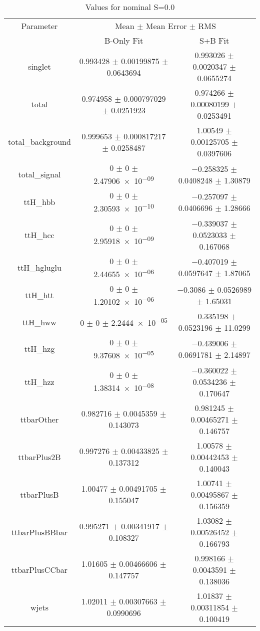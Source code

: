 \begin{table}
\centering
\caption{Values for nominal S=0.0}
\begin{tabular}{ccc}
\toprule
Parameter & \multicolumn{2}{c}{Mean $\pm$ Mean Error $\pm$ RMS}\\
 & B-Only Fit & S+B Fit\\
\midrule
singlet & \num{0.993428} $\pm$ \num{0.00199875} $\pm$ \num{0.0643694} & \num{0.993026} $\pm$ \num{0.0020347} $\pm$ \num{0.0655274}\\
total & \num{0.974958} $\pm$ \num{0.000797029} $\pm$ \num{0.0251923} & \num{0.974266} $\pm$ \num{0.00080199} $\pm$ \num{0.0253491}\\
total\_background & \num{0.999653} $\pm$ \num{0.000817217} $\pm$ \num{0.0258487} & \num{1.00549} $\pm$ \num{0.00125705} $\pm$ \num{0.0397606}\\
total\_signal & \num{0} $\pm$ \num{0} $\pm$ \num{2.47906e-09} & \num{-0.258325} $\pm$ \num{0.0408248} $\pm$ \num{1.30879}\\
ttH\_hbb & \num{0} $\pm$ \num{0} $\pm$ \num{2.30593e-10} & \num{-0.257097} $\pm$ \num{0.0406696} $\pm$ \num{1.28666}\\
ttH\_hcc & \num{0} $\pm$ \num{0} $\pm$ \num{2.95918e-09} & \num{-0.339037} $\pm$ \num{0.0523033} $\pm$ \num{0.167068}\\
ttH\_hgluglu & \num{0} $\pm$ \num{0} $\pm$ \num{2.44655e-06} & \num{-0.407019} $\pm$ \num{0.0597647} $\pm$ \num{1.87065}\\
ttH\_htt & \num{0} $\pm$ \num{0} $\pm$ \num{1.20102e-06} & \num{-0.3086} $\pm$ \num{0.0526989} $\pm$ \num{1.65031}\\
ttH\_hww & \num{0} $\pm$ \num{0} $\pm$ \num{2.2444e-05} & \num{-0.335198} $\pm$ \num{0.0523196} $\pm$ \num{11.0299}\\
ttH\_hzg & \num{0} $\pm$ \num{0} $\pm$ \num{9.37608e-05} & \num{-0.439006} $\pm$ \num{0.0691781} $\pm$ \num{2.14897}\\
ttH\_hzz & \num{0} $\pm$ \num{0} $\pm$ \num{1.38314e-08} & \num{-0.360022} $\pm$ \num{0.0534236} $\pm$ \num{0.170647}\\
ttbarOther & \num{0.982716} $\pm$ \num{0.0045359} $\pm$ \num{0.143073} & \num{0.981245} $\pm$ \num{0.00465271} $\pm$ \num{0.146757}\\
ttbarPlus2B & \num{0.997276} $\pm$ \num{0.00433825} $\pm$ \num{0.137312} & \num{1.00578} $\pm$ \num{0.00442453} $\pm$ \num{0.140043}\\
ttbarPlusB & \num{1.00477} $\pm$ \num{0.00491705} $\pm$ \num{0.155047} & \num{1.00741} $\pm$ \num{0.00495867} $\pm$ \num{0.156359}\\
ttbarPlusBBbar & \num{0.995271} $\pm$ \num{0.00341917} $\pm$ \num{0.108327} & \num{1.03082} $\pm$ \num{0.00526452} $\pm$ \num{0.166793}\\
ttbarPlusCCbar & \num{1.01605} $\pm$ \num{0.00466606} $\pm$ \num{0.147757} & \num{0.998166} $\pm$ \num{0.0043591} $\pm$ \num{0.138036}\\
wjets & \num{1.02011} $\pm$ \num{0.00307663} $\pm$ \num{0.0990696} & \num{1.01837} $\pm$ \num{0.00311854} $\pm$ \num{0.100419}\\
\bottomrule
\end{tabular}
\end{table}